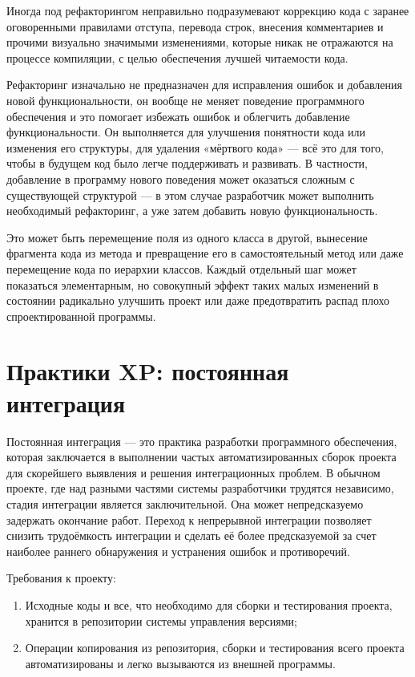 \documentclass{article}
\let\stdsection\section
\renewcommand\section{\newpage\stdsection}
\begin{document}
    Иногда под рефакторингом неправильно подразумевают коррекцию кода с заранее оговоренными правилами отступа, перевода строк, внесения комментариев и прочими визуально значимыми изменениями, которые никак не отражаются на процессе компиляции, с целью обеспечения лучшей читаемости кода.

    Рефакторинг изначально не предназначен для исправления ошибок и добавления новой функциональности, он вообще не меняет поведение программного обеспечения и это помогает избежать ошибок и облегчить добавление функциональности. Он выполняется для улучшения понятности кода или изменения его структуры, для удаления «мёртвого кода» — всё это для того, чтобы в будущем код было легче поддерживать и развивать. В частности, добавление в программу нового поведения может оказаться сложным с существующей структурой — в этом случае разработчик может выполнить необходимый рефакторинг, а уже затем добавить новую функциональность.

    Это может быть перемещение поля из одного класса в другой, вынесение фрагмента кода из метода и превращение его в самостоятельный метод или даже перемещение кода по иерархии классов. Каждый отдельный шаг может показаться элементарным, но совокупный эффект таких малых изменений в состоянии радикально улучшить проект или даже предотвратить распад плохо спроектированной программы.

\section{Практики XP: постоянная интеграция}
    Постоянная интеграция — это практика разработки программного обеспечения, которая заключается в выполнении частых автоматизированных сборок проекта для скорейшего выявления и решения интеграционных проблем. В обычном проекте, где над разными частями системы разработчики трудятся независимо, стадия интеграции является заключительной. Она может непредсказуемо задержать окончание работ. Переход к непрерывной интеграции позволяет снизить трудоёмкость интеграции и сделать её более предсказуемой за счет наиболее раннего обнаружения и устранения ошибок и противоречий.

    Требования к проекту:
    \begin{enumerate}
        \item Исходные коды и все, что необходимо для сборки и тестирования проекта, хранится в репозитории системы управления версиями;
        \item Операции копирования из репозитория, сборки и тестирования всего проекта автоматизированы и легко вызываются из внешней программы.
    \end{enumerate}
\end{document}
